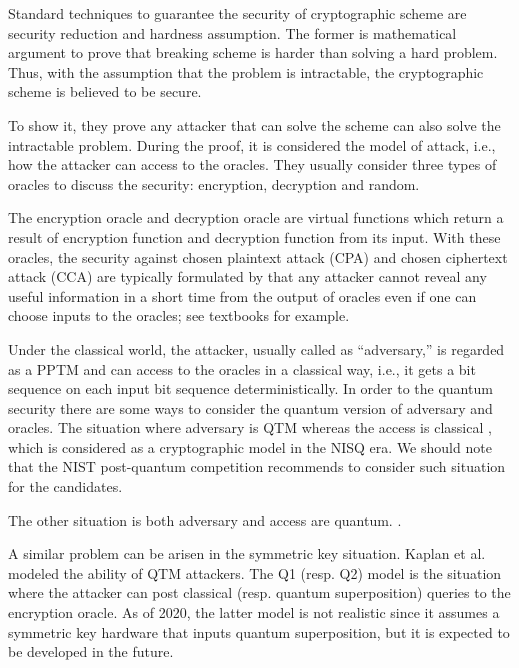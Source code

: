 Standard techniques to guarantee the security of cryptographic scheme 
are security reduction and hardness assumption.
The former is mathematical argument to prove that breaking scheme is harder than solving a hard problem.
Thus, with the assumption that the problem is intractable, 
the cryptographic scheme is believed to be secure.

To show it, they prove any attacker that can solve the scheme can also solve the intractable problem.
During the proof, it is considered the model of attack, i.e., how the attacker can access to the oracles.
They usually consider three types of oracles to discuss the security:  
encryption, decryption and random.

The encryption oracle and decryption oracle are virtual functions which return
a result of encryption function and decryption function from its input.
With these oracles, the security against chosen plaintext attack (CPA) \cite{GM84}
and chosen ciphertext attack (CCA) \cite{NY90,DDN91} are typically 
formulated by that any attacker cannot reveal any useful information in a short time from the output of oracles even if one can choose inputs to the oracles; see textbooks \cite{Gol06book,Gol09book} for example.

Under the classical world, the attacker, usually called as ``adversary,'' is regarded as a PPTM and can access to the oracles in a classical way,
i.e., it gets a bit sequence on each input bit sequence deterministically.
In order to the quantum security there are some ways to consider the quantum version of adversary and oracles.
The situation where adversary is QTM whereas the access is classical
\cite{AJOP20} %
,
which is considered as a cryptographic model in the NISQ era.
We should note that the NIST post-quantum competition 
recommends to consider such situation \cite{NISTpqcriteria} for the candidates.

The other situation is both adversary and access are quantum.
\cite{BZCG13,GHS16} %
.

A similar problem can be arisen in the symmetric key situation.
Kaplan et al. \cite{KLLN16} modeled the ability of QTM attackers.
The Q1 (resp. Q2) model is the situation where the attacker can post classical (resp. quantum superposition) queries to the encryption oracle.
As of 2020, the latter model is not realistic since it assumes a symmetric key hardware that inputs quantum superposition, but it is expected to be developed in the future.

